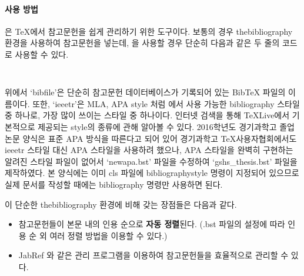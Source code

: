 \paragraph{ 사용 방법}
 은 \TeX 에서 참고문헌을 쉽게 관리하기 위한 도구이다. 보통의 
경우 thebibliography 환경을 사용하여 참고문헌을 넣는데, 을 
사용할 경우 단순히 다음과 같은 두 줄의 코드로 사용할 수 있다. 
\begin{lstlisting}


\end{lstlisting}
위에서 `bibfile'은 단순히 참고문헌 데이터베이스가 기록되어 있는 BibTeX 파일의 
이름이다. 또한, `ieeetr'은 MLA, APA style 처럼  에서 사용 
가능한 bibliography 스타일 중 하나로, 가장 많이 쓰이는 스타일 중 하나이다. 
인터넷 검색을 통해 TeXLive에서 기본적으로 제공되는  style의 
종류에 관해 알아볼 수 있다. 2016학년도 경기과학고 졸업논문 양식은 표준 APA 
방식을 따른다고 되어 있어 경기과학고 \TeX 사용자협회에서도 ieeetr 스타일 대신 
APA 스타일을 사용하려 했으나, APA 스타일을 완벽히 구현하는 알려진 스타일 파일이 
없어서 `newapa.bst' 파일을 수정하여 `gshs\_thesis.bst' 파일을 제작하였다.
본 양식에는 이미 cls 파일에 bibliographystyle 명령이 지정되어 있으므로 실제 
문서를 작성할 때에는 bibliography 명령만 사용하면 된다.

이 단순한 thebibliography 환경에 비해 갖는 장점들은 다음과 같다.
\begin{itemize}
	\item 참고문헌들이 본문 내의 인용 순으로 {\bf 자동 정렬}된다. (.bst 
	파일의 설정에 따라 인용 순 외 여러 정렬 방법을 이용할 수 있다.)
	\item JabRef 와 같은  관리 프로그램을 이용하여 
	참고문헌들을 효율적으로 관리할 수 있다.
\end{itemize}

